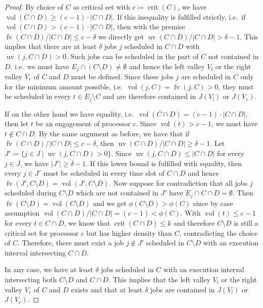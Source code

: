 \documentclass[a4paper]{article}
\DeclareMathOperator{\fv}{fv}
\DeclareMathOperator{\uv}{uv}
\DeclareMathOperator{\vol}{vol}
\DeclareMathOperator{\crit}{crit}
\begin{document}
\begin{proof}
  By choice of $C$ as critical set with $c \coloneqq \crit(C)$, we have $\vol(C \cap D) \geq (c-1) \cdot |C \cap D|$.
  If this inequality is fulfilled strictly, i.e.\ if
  $\vol(C \cap D) > (c-1) \cdot |C \cap D|$, then with the premise
  $\fv(C \cap D) / |C \cap D| \leq c - \delta$ we directly get $\uv(C \cap D) / |C \cap D| > \delta - 1$.
  This implies that there are at least $\delta$ jobs $j$ scheduled in $C \cap D$ with $\uv(j, C \cap D) > 0$.
  Such jobs can be scheduled in the part of $C$ not contained in $D$, i.e.\ we must have $E_j \cap (C \setminus D) \neq \emptyset$ and hence the left valley $V_l$ or the right valley $V_r$ of $C$ and $D$ must be defined.
  Since these jobs $j$ are scheduled in $C$ only for the minimum amount possible, i.e.\ $\vol(j, C) = \fv(j, C) > 0$, they must be scheduled in every $t \in E_j \setminus C$ and are therefore contained in $J(V_l)$ or $J(V_r)$.

  If on the other hand we have equality, i.e.\ $\vol(C \cap D) = (c-1) \cdot |C \cap D|$, then let $t$ be an engagement of processor $c$.
  Since $\vol(t) > c-1$, we must have $t \notin C \cap D$.
  By the same argument as before, we have that if $\fv(C \cap D) / |C \cap D| \leq c - \delta$, then $\uv(C \cap D) / |C \cap D| \geq \delta - 1$.
  Let $J' \coloneqq \{ j \in J \mid \uv(j, C \cap D) > 0 \}$.
  Since $\uv(j, C \cap D) \leq | C \cap D |$ for every $j \in J$, we have $|J'| \geq \delta - 1$.
  If this lower bound is fulfilled with equality, then every $j \in J'$ must be scheduled in every time slot of $C \cap D$ and hence $\fv(J', C \setminus D) = \vol(J', C \setminus D)$.
  Now suppose for contradiction that all jobs $j$ scheduled during $C \setminus D$ which are not contained in $J'$ have $E_j \cap C \cap D = \emptyset$.
  Then $\fv(C \setminus D) = \vol(C \setminus D)$ and
  we get $\phi(C \setminus D) > \phi(C)$ since by case assumption $\vol(C \cap D) / |C \cap D| = (c-1) < \phi(C)$.
  With $\vol(t) \leq c - 1$ for every $t \in C \cap D$, we know that $\crit(C \cap D) \leq k$ and therefore $C \setminus D$ is still a critical set for processor $c$ but has higher density than $C$, contradicting the choice of $C$.
  Therefore, there must exist a job $j \notin J'$ scheduled in $C \setminus D$ with an execution interval intersecting $C \cap D$.

  In any case, we have at least $\delta$ jobs scheduled in $C$ with an execution interval intersecting both $C \setminus D$ and $C \cap D$.
  This implies that the left valley $V_l$ or the right valley $V_r$ of $C$ and $D$ exists and that at least $\delta$ jobs are contained in $J(V_l)$ or $J(V_r)$.
\end{proof}
\end{document}
